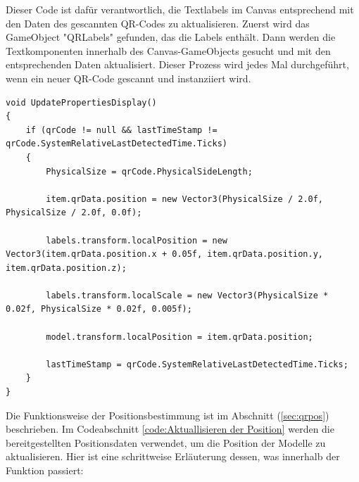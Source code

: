 Dieser Code ist dafür verantwortlich, die Textlabels im Canvas entsprechend mit den Daten des gescannten QR-Codes zu aktualisieren. Zuerst wird das GameObject "QRLabels" gefunden, das die Labels enthält. Dann werden die Textkomponenten innerhalb des Canvas-GameObjects gesucht und mit den entsprechenden Daten aktualisiert. Dieser Prozess wird jedes Mal durchgeführt, wenn ein neuer QR-Code gescannt und instanziiert wird.


\begin{lstlisting}[style=csharp, caption={Aktuallisieren der Position}, label=code:Aktuallisieren der Position]
void UpdatePropertiesDisplay()
{
    if (qrCode != null && lastTimeStamp != qrCode.SystemRelativeLastDetectedTime.Ticks)
    {
        PhysicalSize = qrCode.PhysicalSideLength;

        item.qrData.position = new Vector3(PhysicalSize / 2.0f, PhysicalSize / 2.0f, 0.0f);

        labels.transform.localPosition = new Vector3(item.qrData.position.x + 0.05f, item.qrData.position.y, item.qrData.position.z);

        labels.transform.localScale = new Vector3(PhysicalSize * 0.02f, PhysicalSize * 0.02f, 0.005f);

        model.transform.localPosition = item.qrData.position;

        lastTimeStamp = qrCode.SystemRelativeLastDetectedTime.Ticks;
    }
}
\end{lstlisting}
Die Funktionsweise der Positionsbestimmung ist im Abschnitt (\ref{sec:qrpos}) beschrieben. Im Codeabschnitt \ref{code:Aktuallisieren der Position} werden die bereitgestellten Positionsdaten verwendet, um die Position der Modelle zu aktualisieren. Hier ist eine schrittweise Erläuterung dessen, was innerhalb der Funktion passiert:
